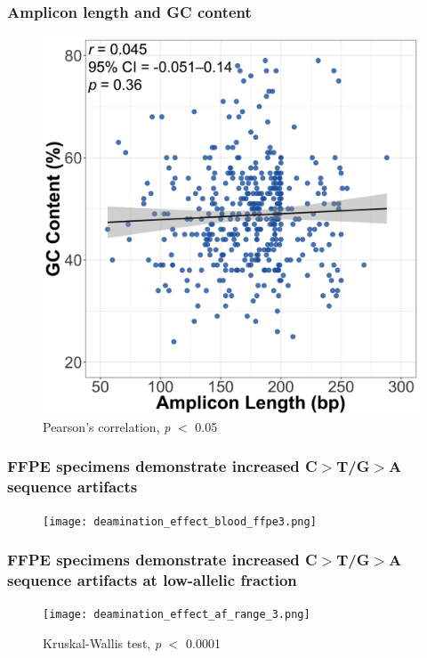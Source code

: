 \documentclass{beamer}
\begin{document}
\begin{frame}
\frametitle{Amplicon length and GC content}
\begin{figure}[t]
    \includegraphics[scale=0.08]{amp_gc_length.png}
    \caption{\scriptsize Pearson's correlation, \textit{p} $<$ 0.05}
\end{figure}
\end{frame}

\begin{frame}
\frametitle{FFPE specimens demonstrate increased C$>$T/G$>$A sequence artifacts}
\begin{figure}[t]
    \texttt{[image: deamination\_effect\_blood\_ffpe3.png]}
\end{figure}
\end{frame}

\begin{frame}
\frametitle{FFPE specimens demonstrate increased C$>$T/G$>$A sequence artifacts at low-allelic fraction}
\begin{figure}[t]
    \texttt{[image: deamination\_effect\_af\_range\_3.png]}
    \caption{\scriptsize Kruskal-Wallis test, \textit{p} $<$ 0.0001}
\end{figure}
\end{frame}
\end{document}
